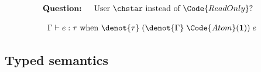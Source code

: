 \begin{align*}
  \\&\textbf{Question: } \quad \text{User $\chstar$ instead of $\Code{ReadOnly}$?}
\end{align*}\noindent

\begin{theorem}
  \begin{align*}
    \Gamma \vdash e : \tau \text{ when } \denot{\tau}\;(\denot{\Gamma}\;\Code{Atom}(\textbf{1}))\;e
  \end{align*}\noindent
\end{theorem}

\newpage


\subsection{Typed semantics}

